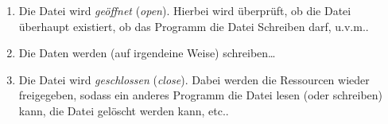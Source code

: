 		\begin{enumerate}
			\item Die Datei wird \textit{geöffnet} (\textit{open}). Hierbei wird überprüft, ob die Datei überhaupt existiert, ob das Programm die Datei Schreiben darf, u.v.m..
			\item Die Daten werden (auf irgendeine Weise) schreiben\dots
			\item Die Datei wird \textit{geschlossen} (\textit{close}). Dabei werden die Ressourcen wieder freigegeben, sodass ein anderes Programm die Datei lesen (oder schreiben) kann, die Datei gelöscht werden kann, etc..
		\end{enumerate}
		
